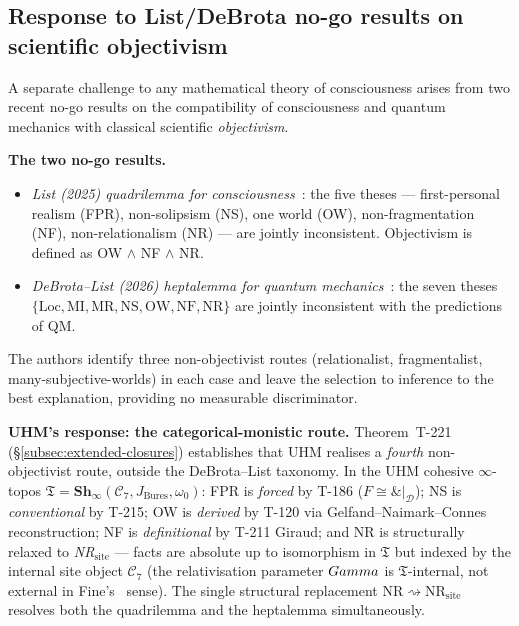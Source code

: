 \subsection{Response to List/DeBrota no-go results on scientific objectivism}
\label{subsec:list-debrota-response}

A separate challenge to any mathematical theory of consciousness
arises from two recent no-go results on the compatibility of
consciousness and quantum mechanics with classical scientific
\emph{objectivism}.

\textbf{The two no-go results.}
\begin{itemize}[leftmargin=2em,nosep]
  \item \emph{List (2025) quadrilemma for
        consciousness}~\cite{list2025quadrilemma}: the five theses
        --- first-personal realism (FPR), non-solipsism (NS), one
        world (OW), non-fragmentation (NF), non-relationalism (NR)
        --- are jointly inconsistent. Objectivism is defined as
        OW $\wedge$ NF $\wedge$ NR.
  \item \emph{DeBrota--List (2026) heptalemma for quantum
        mechanics}~\cite{debrota2026heptalemma,debrotalist2026preprint}:
        the seven theses $\{\mathrm{Loc}, \mathrm{MI}, \mathrm{MR},
        \mathrm{NS}, \mathrm{OW}, \mathrm{NF}, \mathrm{NR}\}$ are
        jointly inconsistent with the predictions of QM.
\end{itemize}

The authors identify three non-objectivist routes (relationalist,
fragmentalist, many-subjective-worlds) in each case and leave the
selection to inference to the best explanation, providing no
measurable discriminator.

\textbf{UHM's response: the categorical-monistic route.} Theorem~T-221
(\S\ref{subsec:extended-closures}) establishes that UHM realises a
\emph{fourth} non-objectivist route, outside the DeBrota--List
taxonomy. In the UHM cohesive $\infty$-topos $\mathfrak T =
\mathbf{Sh}_\infty(\mathcal C_7, J_{\mathrm{Bures}}, \omega_0)$:
FPR is \emph{forced} by T-186 ($F \cong \&|_{\mathcal D}$); NS is
\emph{conventional} by T-215; OW is \emph{derived} by T-120 via
Gelfand--Naimark--Connes reconstruction; NF is \emph{definitional} by
T-211 Giraud; and NR is structurally relaxed to
\emph{NR}$_{\mathrm{site}}$ --- facts are absolute up to isomorphism
in $\mathfrak T$ but indexed by the internal site object
$\mathcal C_7$ (the relativisation parameter $Gamma$ is
$\mathfrak T$-internal, not external in Fine's~\cite{fine2005tense}
sense). The single structural replacement
$\mathrm{NR} \rightsquigarrow \mathrm{NR}_{\mathrm{site}}$ resolves
both the quadrilemma and the heptalemma simultaneously.

